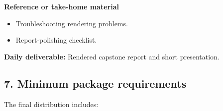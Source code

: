 \documentclass[11pt]{article}
\providecommand{\tightlist}{%
  \setlength{\itemsep}{0pt}\setlength{\parskip}{0pt}}
\begin{document}
\textbf{Reference or take-home material}

\begin{itemize}
\tightlist
\item
  Troubleshooting rendering problems.
\item
  Report-polishing checklist.
\end{itemize}

\textbf{Daily deliverable:} Rendered capstone report and short
presentation.

\hypertarget{minimum-package-requirements}{%
\subsection{7. Minimum package
requirements}\label{minimum-package-requirements}}

The final distribution includes:
\end{document}
